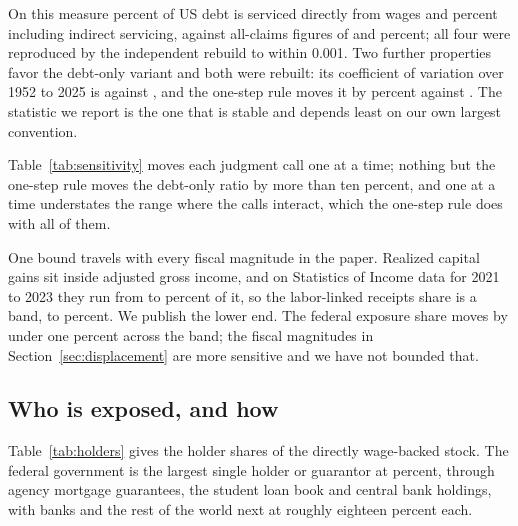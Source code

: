 On this measure  percent of US debt is serviced directly from wages and
 percent including indirect servicing, against all-claims figures of
 and  percent; all four were reproduced by the
independent rebuild to within 0.001. Two further properties favor the debt-only variant and both
were rebuilt: its coefficient of variation over 1952 to 2025 is  against
, and the one-step rule moves it by  percent against
. The statistic we report is the one that is stable and depends
least on our own largest convention.

Table~\ref{tab:sensitivity} moves each judgment call one at a time; nothing but the one-step rule
moves the debt-only ratio by more than ten percent, and one at a time understates the range where
the calls interact, which the one-step rule does with all of them.

\begin{table}[htbp]
\centering
\caption{Sensitivity of the debt-only labor backing ratio, one judgment call at a time.
Computed on the coverage construction, which is the basis these sensitivities were built and
rebuilt against; the moves, not the levels, are what the table reports. Measured, rebuilt.}
\label{tab:sensitivity}

\end{table}

One bound travels with every fiscal magnitude in the paper. Realized capital gains sit inside
adjusted gross income, and on Statistics of Income data for 2021 to 2023 they run from
 to  percent of it, so the labor-linked receipts share is
a band,  to  percent. We publish the lower end. The
federal exposure share moves by under one percent across the band; the fiscal magnitudes in
Section~\ref{sec:displacement} are more sensitive and we have not bounded that.

\subsection{Who is exposed, and how}
\label{sec:holders}

Table~\ref{tab:holders} gives the holder shares of the directly wage-backed stock. The federal
government is the largest single holder or guarantor at  percent,
through agency mortgage guarantees, the student loan book and central bank holdings, with banks
and the rest of the world next at roughly eighteen percent each.

